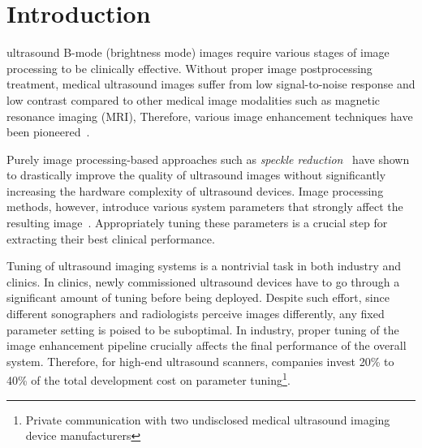 
\section{Introduction}\label{section:introduction}
 ultrasound B-mode (brightness mode) images require various stages of image processing to be clinically effective.
Without proper image postprocessing treatment, medical ultrasound images suffer from low signal-to-noise response and low contrast compared to other medical image modalities such as magnetic resonance imaging (MRI), 
Therefore, various image enhancement techniques have been pioneered~\cite{contrerasortiz_ultrasound_2012}.

Purely image processing-based approaches such as \textit{speckle reduction}~\cite{finn_echocardiographic_2011, duarte-salazar_speckle_2020} have shown to drastically improve the quality of ultrasound images without significantly increasing the hardware complexity of ultrasound devices. 
Image processing methods, however, introduce various system parameters that strongly affect the resulting image~\cite{duarte-salazar_speckle_2020}.
Appropriately tuning these parameters is a crucial step for extracting their best clinical performance.%

Tuning of ultrasound imaging systems is a nontrivial task in both industry and clinics.
In clinics, newly commissioned ultrasound devices have to go through a significant amount of tuning before being deployed.
Despite such effort, since different sonographers and radiologists perceive images differently, any fixed parameter setting is poised to be suboptimal.
In industry, proper tuning of the image enhancement pipeline crucially affects the final performance of the overall system.
Therefore, for high-end ultrasound scanners, companies invest 20\% to 40\% of the total development cost on parameter tuning\footnote{Private communication with two undisclosed medical ultrasound imaging device manufacturers}.


